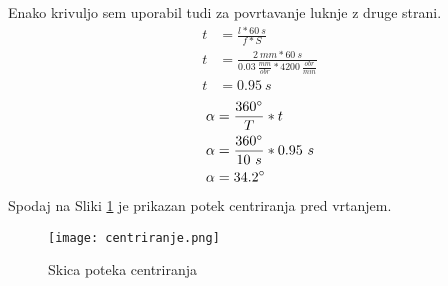 Enako krivuljo sem uporabil tudi za povrtavanje luknje z druge strani.
\begin{equation}
	\begin{split}
		t &= \frac{l*60\ s}{f*S} \\
		t &= \frac{2\ mm*60\ s}{0.03\ \frac{mm}{obr}*4200\ \frac{obr}{min}} \\
		t &= 0.95\ s
	\end{split}
\end{equation}
\begin{equation}
	\begin{split}
		\alpha &= \frac{360\degree}{T} * t \\
		\alpha &= \frac{360\degree}{10\ s} * 0.95\  s\\
		\alpha &= 34.2\degree
	\end{split}
\end{equation}
Spodaj na Sliki \ref{centriranje} je prikazan potek
centriranja pred vrtanjem.
\begin{figure}[H]
	\begin{center}
		\texttt{[image: centriranje.png]}
		\caption{Skica poteka centriranja
			\cite{lasten}}
		\label{centriranje}
	\end{center}
\end{figure}
